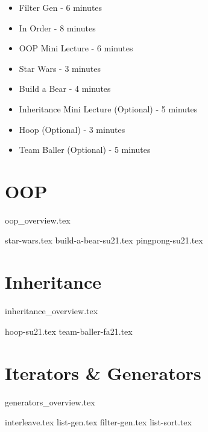 \documentclass{exam}
\begin{document}
\begin{guide}
\begin{itemize}
\begin{itemize}
            \item Filter Gen - 6 minutes
            \item In Order - 8 minutes
            \item OOP Mini Lecture - 6 minutes
            \item Star Wars - 3 minutes
            \item Build a Bear - 4 minutes
            \item Inheritance Mini Lecture (Optional) - 5 minutes
            \item Hoop (Optional) - 3 minutes
            \item Team Baller (Optional) - 5 minutes
        \end{itemize}
    \end{itemize}
\end{guide}

\section{OOP}
{oop_overview.tex}
\newpage
\begin{questions}
{star-wars.tex}
{build-a-bear-su21.tex}
{pingpong-su21.tex}
\end{questions}

\newpage
\section{Inheritance}
{inheritance_overview.tex}
\begin{questions}
{hoop-su21.tex}
{team-baller-fa21.tex}
\end{questions}

\newpage
\section{Iterators \& Generators}
{generators_overview.tex}
\begin{questions}
{interleave.tex}
\newpage
{list-gen.tex}
{filter-gen.tex}
\newpage
{list-sort.tex}
\end{questions}
\end{document}
